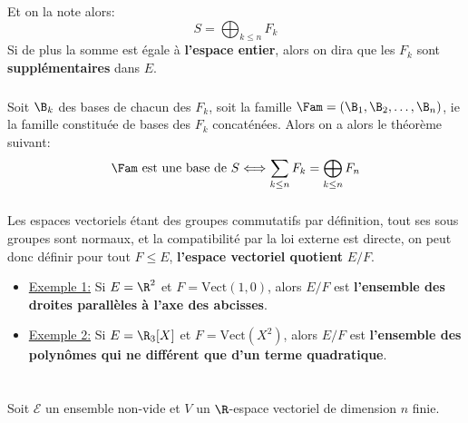 Et on la note alors:
\[
   S = \bigoplus_{k \leq n} F_k
\]
Si de plus la somme est égale à \textbf{l'espace entier}, alors on dira que les \(F_k\) sont \textbf{supplémentaires} dans \(E\).
\subsection*{}
Soit \(\B_k\) des bases de chacun des \(F_k\), soit la famille \(\Fam = (\B_1, \B_2, \ldots, \B_n)\), ie la famille constituée de bases des \(F_k\) concaténées. Alors on a alors le théorème suivant:
\[
   \Fam \text{ est une base de } S \Longleftrightarrow \sum_{k \leq n} F_k = \bigoplus_{k \leq n} F_n
\]

\subsection*{}
Les espaces vectoriels étant des groupes commutatifs par définition, tout ses sous groupes sont normaux, et la compatibilité par la loi externe est directe, on peut donc définir pour tout \( F \leq E \), \textbf{l'espace vectoriel quotient} \( E/F \).
\begin{itemize}
   \item \uline{Exemple 1:} Si \( E = \R^2 \) et \( F = \text{Vect}(1, 0) \), alors \( E/F \) est \textbf{l'ensemble des droites parallèles à l'axe des abcisses}.
   \item \uline{Exemple 2:} Si \( E = \R_3[X] \) et \( F = \text{Vect}(X^2) \), alors \( E/F \) est \textbf{l'ensemble des polynômes qui ne différent que d'un terme quadratique}.
\end{itemize}

\chapter*{} %
Soit \(\mathscr{E}\) un ensemble non-vide et \(V\) un \(\R\)-espace vectoriel de dimension \(n\) finie.
